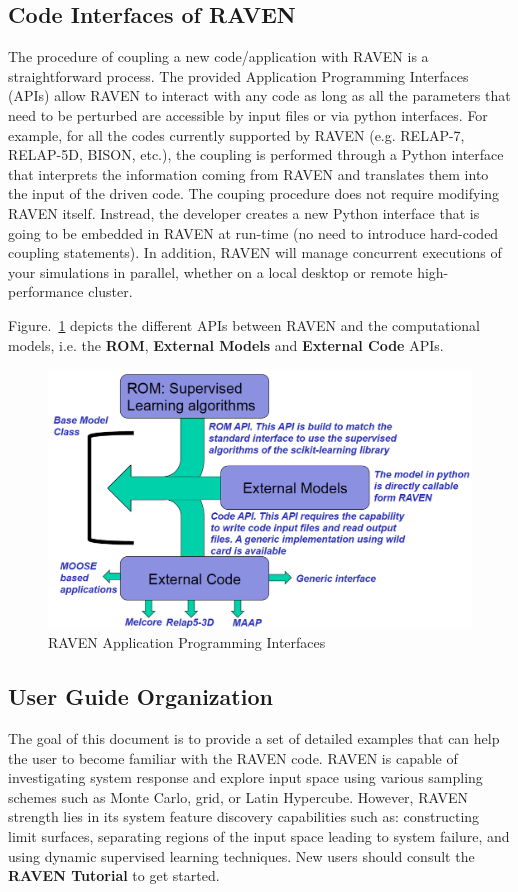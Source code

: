 

\subsection{Code Interfaces of RAVEN}
The procedure of coupling a new code/application with RAVEN is a straightforward process. The provided Application
Programming Interfaces (APIs) allow RAVEN to interact with any code as long as all the parameters that need to be
perturbed are accessible by input files or via python interfaces. For example, for all the codes currently
supported by RAVEN (e.g. RELAP-7, RELAP-5D, BISON, etc.), the coupling is performed through a Python interface
that interprets the information coming from RAVEN and translates them into the input of the driven code. The couping procedure
does not require modifying RAVEN itself. Instread, the developer creates a new Python interface that is going to
be embedded in RAVEN at run-time (no need to introduce hard-coded coupling statements). In addition, RAVEN will
manage concurrent executions of your simulations in parallel, whether on a local desktop or remote high-performance cluster.

Figure.~\ref{fig:modelAPIs} depicts the different APIs between RAVEN and the computational models, i.e. the
\textbf{ROM}, \textbf{External Models} and \textbf{External Code} APIs.

\begin{figure}[h!]
  \includegraphics[width=\textwidth]{pics/modelAPIs.png}
  \caption{RAVEN Application Programming Interfaces}
  \label{fig:modelAPIs}
\end{figure}

\clearpage

\subsection{User Guide Organization}
The goal of this document is to provide a set of detailed examples that can help the user to become familiar with
the RAVEN code. RAVEN is capable of investigating system response and explore input space using various
sampling schemes such as Monte Carlo, grid, or Latin Hypercube. However, RAVEN strength lies in its system feature
discovery capabilities such as: constructing limit surfaces, separating regions of the input space leading to
system failure, and using dynamic supervised learning techniques. New users should consult the \textbf{RAVEN Tutorial}
to get started.

